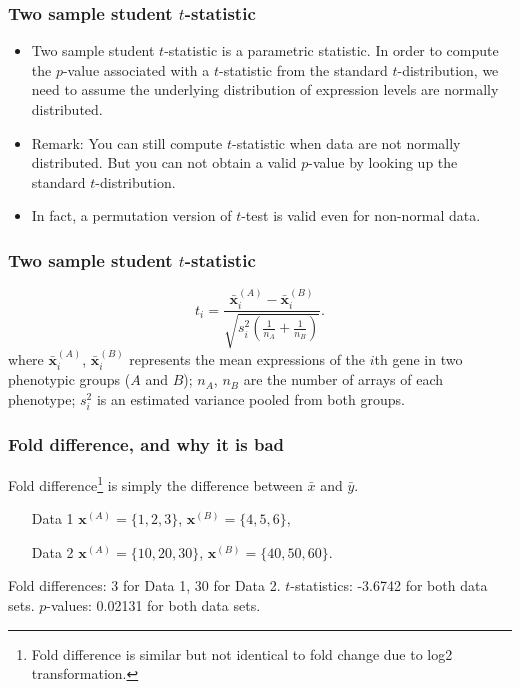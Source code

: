 \begin{frame}
  \frametitle{Two sample student $t$-statistic} 
  \begin{itemize}
  \item Two sample student $t$-statistic is a parametric statistic. In
    order to compute the $p$-value associated with a $t$-statistic
    from the standard $t$-distribution, we need to assume the
    underlying distribution of expression levels are normally
    distributed.
  \item Remark: You can still compute $t$-statistic when data are not
    normally distributed.  But you can not obtain a valid $p$-value by
    looking up the \alert{standard $t$-distribution}.
  \item In fact, a permutation version of $t$-test is valid even for
    non-normal data.
  \end{itemize}
\end{frame}

\begin{frame}
  \frametitle{Two sample student $t$-statistic} 
  \begin{equation}
    \label{eq:t}
    t_{i} = \frac{\bar{\mathbf{x}}^{(A)}_{i}-\bar{\mathbf{x}}^{(B)}_{i}} {\sqrt{s^2_{i}(\frac{1}{n_{A}}+\frac{1}{n_{B}})}}.
  \end{equation}
  where $\bar{\mathbf{x}}^{(A)}_{i}$, $\bar{\mathbf{x}}^{(B)}_{i}$
  represents the mean expressions of the $i$th gene in two phenotypic
  groups ($A$ and $B$); $n_{A}$, $n_{B}$ are the number of arrays of
  each phenotype; $s^{2}_{i}$ is an estimated variance pooled from
  both groups.
\end{frame}

\begin{frame}
  \frametitle{Fold difference, and why it is bad}
  Fold difference\footnote{Fold difference is similar but not
    identical to fold change due to log2 transformation.} is simply
  the difference between $\bar{x}$ and $\bar{y}$.
  \begin{itemize}
  \item[Data 1] $\mathbf{x}^{(A)} = \{1,2,3\}$, $\mathbf{x}^{(B)} = \{4,5,6\}$,
  \item[Data 2] $\mathbf{x}^{(A)} = \{10,20,30\}$, $\mathbf{x}^{(B)} = \{40,50,60\}$.
  \end{itemize}
  Fold differences: 3 for Data 1, 30 for Data 2.  $t$-statistics:
  -3.6742 for both data sets.  $p$-values: 0.02131 for both data sets.
  \cite{Shi2006MicroArrayQualityControl,Klebanov2007Statisticalmethodsand}
\end{frame}

